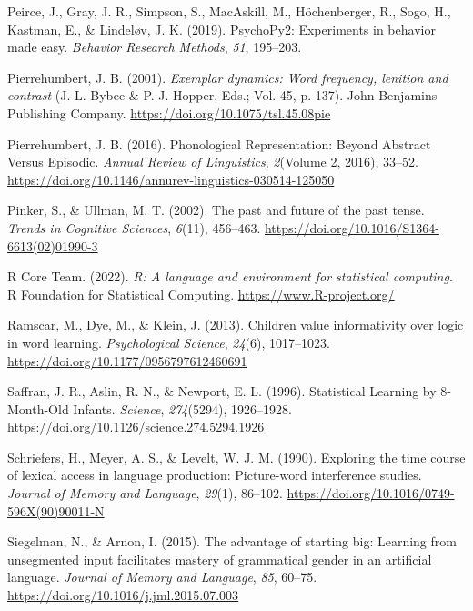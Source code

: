 \documentclass[
  12pt,
  letterpaper,
]{scrreprt}
\newlength{\cslhangindent}
\newenvironment{CSLReferences}[2] %
 {\begin{list}{}{%
  \setlength{\itemindent}{0pt}
  \setlength{\leftmargin}{0pt}
  \setlength{\parsep}{0pt}
  \ifodd #1
   \setlength{\leftmargin}{\cslhangindent}
   \setlength{\itemindent}{-1\cslhangindent}
  \fi
  \setlength{\itemsep}{#2\baselineskip}}}
 {\end{list}}
\begin{document}
\begin{CSLReferences}{1}{0}
Peirce, J., Gray, J. R., Simpson, S., MacAskill, M., Höchenberger, R.,
Sogo, H., Kastman, E., \& Lindeløv, J. K. (2019). PsychoPy2: Experiments
in behavior made easy. \emph{Behavior Research Methods}, \emph{51},
195--203.

Pierrehumbert, J. B. (2001). \emph{Exemplar dynamics: Word frequency,
lenition and contrast} (J. L. Bybee \& P. J. Hopper, Eds.; Vol. 45, p.
137). John Benjamins Publishing Company.
\url{https://doi.org/10.1075/tsl.45.08pie}

Pierrehumbert, J. B. (2016). Phonological Representation: Beyond
Abstract Versus Episodic. \emph{Annual Review of Linguistics},
\emph{2}(Volume 2, 2016), 33--52.
\url{https://doi.org/10.1146/annurev-linguistics-030514-125050}

Pinker, S., \& Ullman, M. T. (2002). The past and future of the past
tense. \emph{Trends in Cognitive Sciences}, \emph{6}(11), 456--463.
\url{https://doi.org/10.1016/S1364-6613(02)01990-3}

R Core Team. (2022). \emph{R: A language and environment for statistical
computing}. R Foundation for Statistical Computing.
\url{https://www.R-project.org/}

Ramscar, M., Dye, M., \& Klein, J. (2013). Children value informativity
over logic in word learning. \emph{Psychological Science}, \emph{24}(6),
1017--1023. \url{https://doi.org/10.1177/0956797612460691}

Saffran, J. R., Aslin, R. N., \& Newport, E. L. (1996). Statistical
Learning by 8-Month-Old Infants. \emph{Science}, \emph{274}(5294),
1926--1928. \url{https://doi.org/10.1126/science.274.5294.1926}

Schriefers, H., Meyer, A. S., \& Levelt, W. J. M. (1990). Exploring the
time course of lexical access in language production: Picture-word
interference studies. \emph{Journal of Memory and Language},
\emph{29}(1), 86--102.
\url{https://doi.org/10.1016/0749-596X(90)90011-N}

Siegelman, N., \& Arnon, I. (2015). The advantage of starting big:
Learning from unsegmented input facilitates mastery of grammatical
gender in an artificial language. \emph{Journal of Memory and Language},
\emph{85}, 60--75. \url{https://doi.org/10.1016/j.jml.2015.07.003}


\end{CSLReferences}
\end{document}
